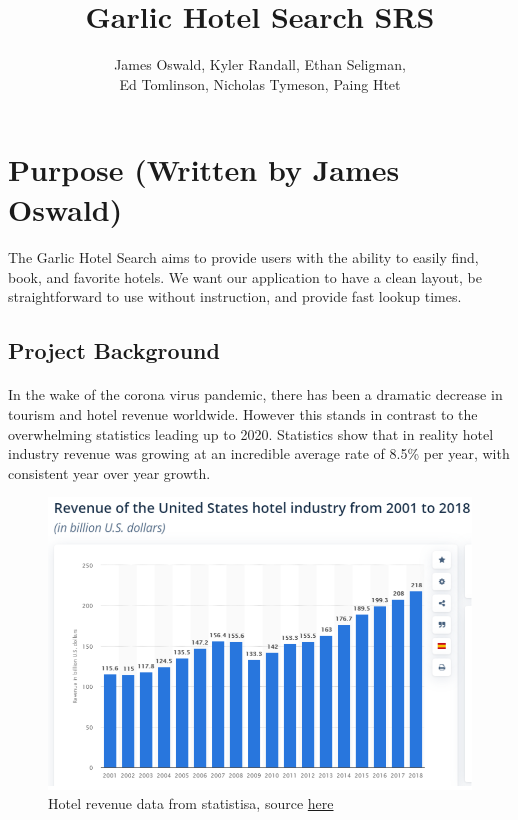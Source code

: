 \documentclass[]{article}
\title{Garlic Hotel Search SRS}
\author{James Oswald, Kyler Randall, Ethan Seligman,\\ Ed Tomlinson, Nicholas Tymeson, Paing Htet}
\date{}
\begin{document}
\maketitle
\thispagestyle{fancy}

\tableofcontents

\section{Purpose (Written by James Oswald)}
\paragraph{}
The Garlic Hotel Search aims to provide users with the ability to easily find, book, and favorite hotels. We want our application to have a clean layout, be straightforward to use without instruction, and provide fast lookup times.
\subsection{Project Background}
\paragraph{}
In the wake of the corona virus pandemic, there has been a dramatic decrease in tourism and hotel revenue worldwide. However this stands in contrast to the overwhelming statistics leading up to 2020. Statistics show that in reality hotel industry revenue was growing at an incredible average rate of 8.5\% per year, with consistent year over year growth.
\begin{figure}[H]
    \centering
    \includegraphics[scale=0.4]{hotelstats.png}
    \caption{Hotel revenue data from statistisa, source \href{https://www.statista.com/statistics/245841/total-revenue-of-the-us-hotel-industry/}{here}}
\end{figure}
\end{document}
